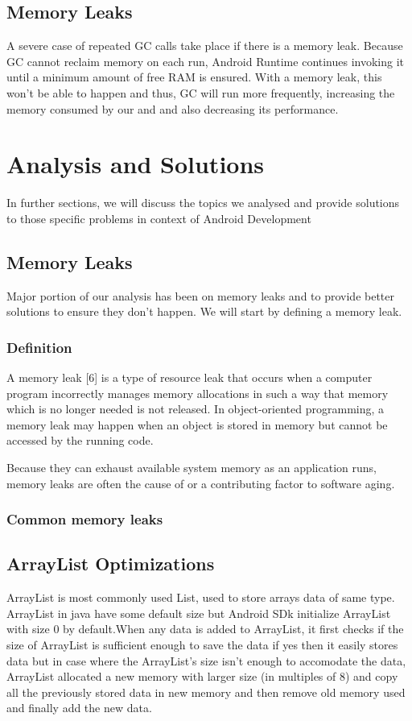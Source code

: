 \documentclass[journal]{IEEEtran}
\begin{document}
\subsection{Memory Leaks}
A severe case of repeated GC calls take place if there is a memory leak. Because GC cannot reclaim memory on each run, Android Runtime continues invoking it until a minimum amount of free RAM is ensured. With a memory leak, this won't be able to happen and thus, GC will run more frequently, increasing the memory consumed by our and and also decreasing its performance.

\newpage

\section{Analysis and Solutions}
In further sections, we will discuss the topics we analysed and provide solutions to those specific problems in context of Android Development

\subsection{Memory Leaks}
Major portion of our analysis has been on memory leaks and to provide better solutions to ensure they don't happen. We will start by defining a memory leak.\\

\subsubsection{Definition}
A memory leak [6] is a type of resource leak that occurs when a computer program incorrectly manages memory allocations in such a way that memory which is no longer needed is not released. In object-oriented programming, a memory leak may happen when an object is stored in memory but cannot be accessed by the running code.

Because they can exhaust available system memory as an application runs, memory leaks are often the cause of or a contributing factor to software aging.\\

\subsubsection{Common memory leaks}

\subsection{ArrayList Optimizations}
ArrayList is most commonly used List, used to store arrays data of same type. ArrayList in java have some default size but Android SDk initialize ArrayList with size 0 by default.When any data is added to ArrayList, it first checks if the size of ArrayList is sufficient enough to save the data if yes then it easily stores data but in case where the ArrayList's size isn't enough to accomodate the data, ArrayList allocated a new memory with larger size (in multiples of 8) and copy all the previously stored data in new memory and then remove old memory used and finally add the new data.
\end{document}
